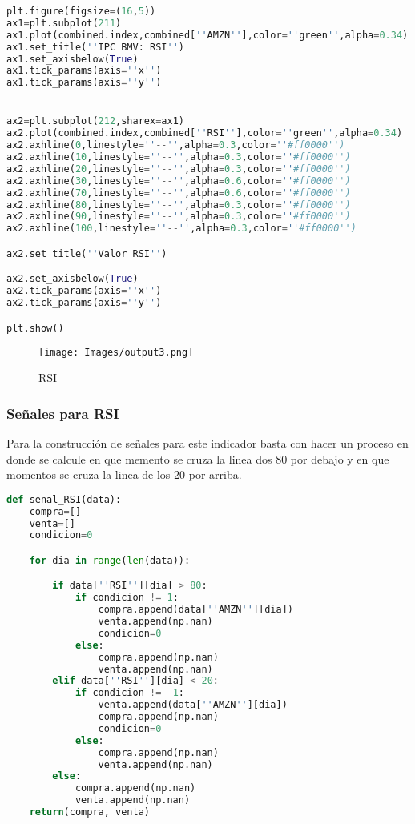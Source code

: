 \documentclass[letterpaper,12pt,oneside]{book}
\begin{document}
\begin{lstlisting}[language=Python]
plt.figure(figsize=(16,5))
ax1=plt.subplot(211)
ax1.plot(combined.index,combined[''AMZN''],color=''green'',alpha=0.34)
ax1.set_title(''IPC BMV: RSI'')
ax1.set_axisbelow(True)
ax1.tick_params(axis=''x'')
ax1.tick_params(axis=''y'')


ax2=plt.subplot(212,sharex=ax1)
ax2.plot(combined.index,combined[''RSI''],color=''green'',alpha=0.34)
ax2.axhline(0,linestyle=''--'',alpha=0.3,color=''#ff0000'')
ax2.axhline(10,linestyle=''--'',alpha=0.3,color=''#ff0000'')
ax2.axhline(20,linestyle=''--'',alpha=0.3,color=''#ff0000'')
ax2.axhline(30,linestyle=''--'',alpha=0.6,color=''#ff0000'')
ax2.axhline(70,linestyle=''--'',alpha=0.6,color=''#ff0000'')
ax2.axhline(80,linestyle=''--'',alpha=0.3,color=''#ff0000'')
ax2.axhline(90,linestyle=''--'',alpha=0.3,color=''#ff0000'')
ax2.axhline(100,linestyle=''--'',alpha=0.3,color=''#ff0000'')

ax2.set_title(''Valor RSI'')

ax2.set_axisbelow(True)
ax2.tick_params(axis=''x'')
ax2.tick_params(axis=''y'')

plt.show()
\end{lstlisting}


\begin{figure}[ht]
	\centering
	\texttt{[image: Images/output3.png]}
	\caption{RSI}
	\label{fig:m4}
\end{figure}



\subsubsection{Señales para RSI}

Para la construcción de señales para este indicador basta con hacer un proceso en donde se calcule en que memento se cruza la linea dos 80 por debajo y en que momentos se cruza la linea de los 20 por arriba.


\begin{lstlisting}[language=Python]
def senal_RSI(data):
    compra=[]
    venta=[]
    condicion=0

    for dia in range(len(data)):

        if data[''RSI''][dia] > 80:
            if condicion != 1:
                compra.append(data[''AMZN''][dia])
                venta.append(np.nan)
                condicion=0
            else:
                compra.append(np.nan)
                venta.append(np.nan)
        elif data[''RSI''][dia] < 20:
            if condicion != -1:
                venta.append(data[''AMZN''][dia])
                compra.append(np.nan)
                condicion=0
            else:
                compra.append(np.nan)
                venta.append(np.nan)
        else:
            compra.append(np.nan)
            venta.append(np.nan)
    return(compra, venta)
\end{lstlisting}
\end{document}
